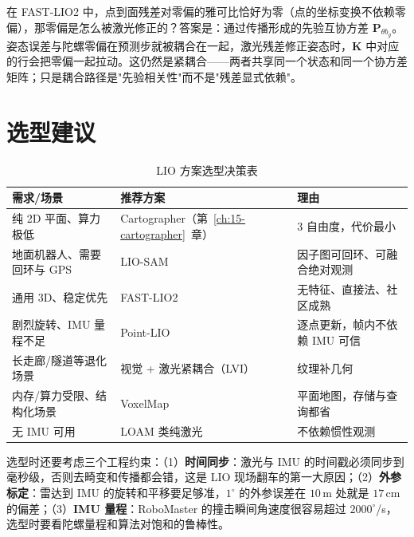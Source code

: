 \begin{remark}[一个容易误解的点]
在 FAST-LIO2 中，点到面残差对零偏的雅可比恰好为零（点的坐标变换不依赖零偏），那零偏是怎么被激光修正的？答案是：通过传播形成的先验互协方差 $\bm{P}_{\theta b_g}$。姿态误差与陀螺零偏在预测步就被耦合在一起，激光残差修正姿态时，$\bm{K}$ 中对应的行会把零偏一起拉动。这仍然是紧耦合——两者共享同一个状态和同一个协方差矩阵；只是耦合路径是"先验相关性"而不是"残差显式依赖"。
\end{remark}

\section{选型建议}\label{sec:16-select}

\begin{table}[htbp]
  \centering
  \caption{LIO 方案选型决策表}\label{tab:16-select}
  \footnotesize
  \begin{tabular}{lll}
    \toprule
    需求/场景 & 推荐方案 & 理由 \\
    \midrule
    纯 2D 平面、算力极低 & Cartographer（第~\ref{ch:15-cartographer}~章） & 3 自由度，代价最小 \\
    地面机器人、需要回环与 GPS & LIO-SAM~\cite{shan2020liosam} & 因子图可回环、可融合绝对观测 \\
    通用 3D、稳定优先 & FAST-LIO2~\cite{xu2022fastlio2} & 无特征、直接法、社区成熟 \\
    剧烈旋转、IMU 量程不足 & Point-LIO~\cite{he2023pointlio} & 逐点更新，帧内不依赖 IMU 可信 \\
    长走廊/隧道等退化场景 & 视觉 + 激光紧耦合（LVI） & 纹理补几何 \\
    内存/算力受限、结构化场景 & VoxelMap~\cite{yuan2022voxelmap} & 平面地图，存储与查询都省 \\
    无 IMU 可用 & LOAM 类纯激光 & 不依赖惯性观测 \\
    \bottomrule
  \end{tabular}
\end{table}

选型时还要考虑三个工程约束：（1）\textbf{时间同步}：激光与 IMU 的时间戳必须同步到毫秒级，否则去畸变和传播都会错，这是 LIO 现场翻车的第一大原因；（2）\textbf{外参标定}：雷达到 IMU 的旋转和平移要足够准，$1^{\circ}$ 的外参误差在 $10$\,m 处就是 $17$\,cm 的偏差；（3）\textbf{IMU 量程}：RoboMaster 的撞击瞬间角速度很容易超过 $2000^{\circ}$/s，选型时要看陀螺量程和算法对饱和的鲁棒性。

